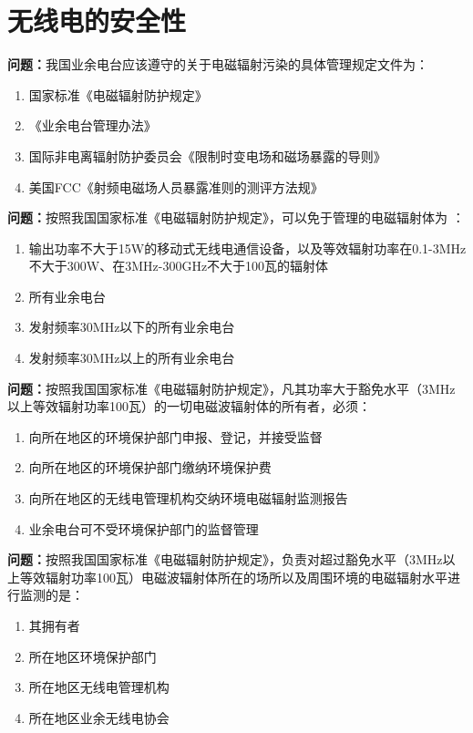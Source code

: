 \chapter{无线电的安全性}


\noindent\textbf{问题：}我国业余电台应该遵守的关于电磁辐射污染的具体管理规定文件为：
\begin{enumerate}[label=\Alph*), leftmargin=3em]
	\item 国家标准《电磁辐射防护规定》
	\item 《业余电台管理办法》
	\item 国际非电离辐射防护委员会《限制时变电场和磁场暴露的导则》
	\item 美国FCC《射频电磁场人员暴露准则的测评方法规》
\end{enumerate}

\bigskip


\noindent\textbf{问题：}按照我国国家标准《电磁辐射防护规定》，可以免于管理的电磁辐射体为 ：
\begin{enumerate}[label=\Alph*), leftmargin=3em]
	\item 输出功率不大于15W的移动式无线电通信设备，以及等效辐射功率在0.1-3MHz不大于300W、在3MHz-300GHz不大于100瓦的辐射体
	\item 所有业余电台
	\item 发射频率30MHz以下的所有业余电台
	\item 发射频率30MHz以上的所有业余电台
\end{enumerate}

\bigskip


\noindent\textbf{问题：}按照我国国家标准《电磁辐射防护规定》，凡其功率大于豁免水平（3MHz以上等效辐射功率100瓦）的一切电磁波辐射体的所有者，必须：
\begin{enumerate}[label=\Alph*), leftmargin=3em]
	\item 向所在地区的环境保护部门申报、登记，并接受监督
	\item 向所在地区的环境保护部门缴纳环境保护费
	\item 向所在地区的无线电管理机构交纳环境电磁辐射监测报告
	\item 业余电台可不受环境保护部门的监督管理
\end{enumerate}

\bigskip


\noindent\textbf{问题：}按照我国国家标准《电磁辐射防护规定》，负责对超过豁免水平（3MHz以上等效辐射功率100瓦）电磁波辐射体所在的场所以及周围环境的电磁辐射水平进行监测的是：
\begin{enumerate}[label=\Alph*), leftmargin=3em]
	\item 其拥有者
	\item 所在地区环境保护部门
	\item 所在地区无线电管理机构
	\item 所在地区业余无线电协会
\end{enumerate}

